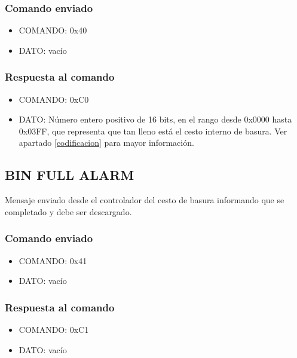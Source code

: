 \documentclass[a4paper,10pt]{article}
\begin{document}
\subsubsection*{Comando enviado}

\begin{itemize}
	\item{COMANDO:} 0x40
	\item{DATO:} vac\'io
\end{itemize}

\subsubsection*{Respuesta al comando}

\begin{itemize}
	\item{COMANDO:} 0xC0
	\item{DATO:} N\'umero entero positivo de 16 bits, en el rango desde 0x0000 hasta 0x03FF,
		que representa que tan lleno est\'a el cesto interno de basura.
		Ver apartado \ref{codificacion} para mayor informaci\'on.
\end{itemize}

\subsection{BIN FULL ALARM}
\label{bin_full_alarm}

Mensaje enviado desde el controlador del cesto de basura informando que se completado y debe ser descargado.

\subsubsection*{Comando enviado}

\begin{itemize}
	\item{COMANDO:} 0x41
	\item{DATO:} vac\'io
\end{itemize}

\subsubsection*{Respuesta al comando}

\begin{itemize}
	\item{COMANDO:} 0xC1
	\item{DATO:} vac\'io
\end{itemize}
\end{document}
